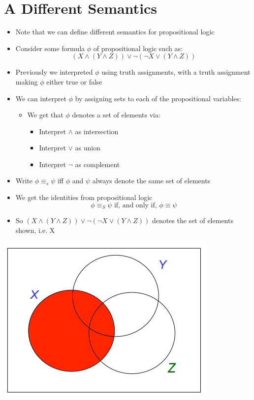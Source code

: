 \documentclass{article}[18pt]
\begin{document}
\section{A Different Semantics}
\begin{itemize}
	\item Note that we can define different semantics for propositional logic
	\item Consider some formula $\phi$ of propositional logic such as:
	$$( X \wedge ( Y \wedge Z ) ) \vee \neg ( \neg X \vee ( Y \wedge Z ) )$$
	\item Previously we interpreted $\phi$ using truth assignments, with a truth assignment making $\phi$ either true or false
	\item We can interpret $\phi$ by assigning sets to each of the propositional variables:
	\begin{itemize}
		\item We get that $\phi$ denotes a set of elements via:
		\begin{itemize}
			\item Interpret $\land$ as intersection
			\item Interpret $\lor$ as union
			\item Interpret $\lnot$ as complement
		\end{itemize}
	\end{itemize}
	\item Write $\phi\equiv_s\psi$  iff $\phi$ and $\psi$ always denote the same set of elements
	\item We get the identities from propositional logic
	$$\phi \equiv _ { S } \psi \text { if, and only if, } \phi \equiv \psi$$
	\item So $( X \wedge ( Y \wedge Z ) ) \vee \neg ( \neg X \vee ( Y \wedge Z ) )$ denotes the set of elements shown, i.e. X
\end{itemize}
\begin{center}
	\includegraphics[scale=0.7]{venn4}
\end{center}
\end{document}
